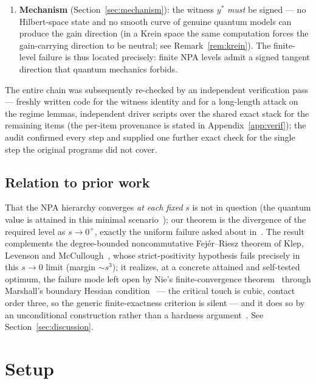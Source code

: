 \documentclass[11pt]{article}
\begin{document}
\begin{enumerate}
  yields Theorem~\ref{thm:main}; the sandwich
  $c_k\le c_2\le c_{1+AB}=4-s+\tfrac3{64}s^2+o(s^2)$ (upper half from the
  companion's dual expansion) pins the overshoot exponent to $2$.
\item \textbf{Mechanism} (Section~\ref{sec:mechanism}): the witness $y^\ast$
  \emph{must} be signed --- no Hilbert-space state and no smooth curve of
  genuine quantum models can produce the gain direction (in a Krein space
  the same computation forces the gain-carrying direction to be neutral;
  see Remark~\ref{rem:krein}). The finite-level
  failure is thus located precisely: finite NPA levels admit a signed
  tangent direction that quantum mechanics forbids.
\end{enumerate}

The entire chain was subsequently re-checked by an independent verification pass ---
freshly written code for the witness identity and for a long-length attack
on the regime lemmas, independent driver scripts over the shared exact
stack for the remaining items (the per-item provenance is stated in
Appendix~\ref{app:verif}); the audit confirmed every step and supplied one
further exact check for the single step the original programs did not
cover.

\subsection{Relation to prior work}

That the NPA hierarchy converges \emph{at each fixed} $s$ is not in
question (the quantum value is attained in this minimal
scenario~\cite{BB}); our theorem is the divergence of the required level as
$s\to0^+$, exactly the uniform failure asked about in~\cite{Gigena}. The
result complements the degree-bounded noncommutative Fej\'er--Riesz theorem
of Klep, Levenson and McCullough~\cite{KLM}, whose strict-positivity
hypothesis fails precisely in this $s\to0$ limit (margin $\sim s^3$); it
realizes, at a concrete attained and self-tested optimum, the failure mode
left open by Nie's finite-convergence theorem~\cite{Nie} through Marshall's
boundary Hessian condition~\cite{Marshall} --- the critical touch is cubic,
contact order three, so the generic finite-exactness criterion is silent ---
and it does so by an unconditional construction rather than a hardness
argument~\cite{hardness}. See Section~\ref{sec:discussion}.

\section{Setup}\label{sec:setup}
\end{document}
